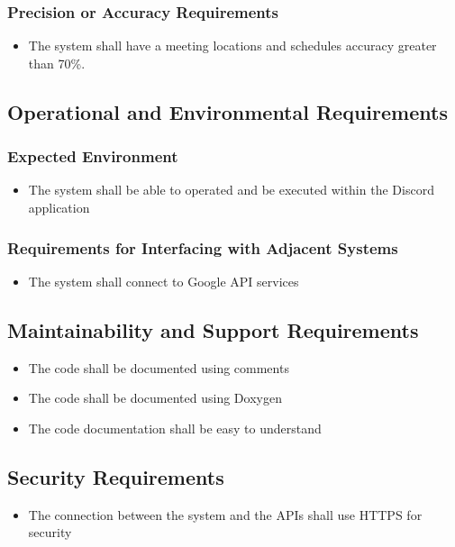\documentclass[12pt, titlepage]{article}
\begin{document}
\subsubsection{Precision or Accuracy Requirements}
\begin{itemize}
    \item The system shall have a meeting locations and schedules accuracy greater than 70\%.
\end{itemize}

\subsection{Operational and Environmental Requirements}
\subsubsection{Expected Environment}
\begin{itemize}
    \item The system shall be able to operated and be executed within the Discord application
\end{itemize}
\subsubsection{Requirements for Interfacing with Adjacent Systems}
\begin{itemize}
    \item The system shall connect to Google API services
\end{itemize}

\subsection{Maintainability and Support Requirements}
\begin{itemize}
    \item The code shall be documented using comments
    \item The code shall be documented using Doxygen
    \item The code documentation shall be easy to understand
\end{itemize}

\subsection{Security Requirements}
\begin{itemize}
    \item The connection between the system and the APIs shall use HTTPS for security
\end{itemize}
\end{document}
